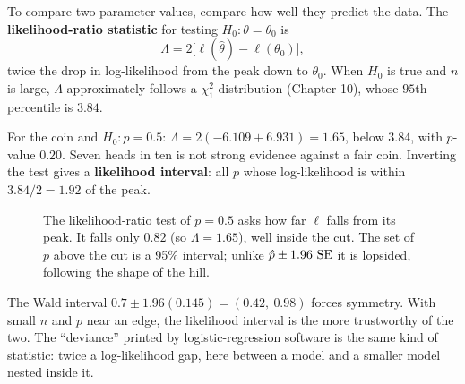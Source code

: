 To compare two parameter values, compare how well they predict the data. The
\textbf{likelihood-ratio statistic} for testing $H_0\colon \theta=\theta_0$ is
\[
  \Lambda = 2\big[\ell(\hat\theta) - \ell(\theta_0)\big],
\]
twice the drop in log-likelihood from the peak down to $\theta_0$. When $H_0$ is true
and $n$ is large, $\Lambda$ approximately follows a $\chi^2_1$ distribution (Chapter 10),
whose $95$th percentile is $3.84$.

For the coin and $H_0\colon p=0.5$: $\Lambda = 2(-6.109 + 6.931) = 1.65$, below
$3.84$, with $p$-value $0.20$. Seven heads in ten is not strong evidence against a fair
coin. Inverting the test gives a \textbf{likelihood interval}: all $p$ whose
log-likelihood is within $3.84/2 = 1.92$ of the peak.

\begin{figure}[H]
\centering
{}
\caption{The likelihood-ratio test of $p=0.5$ asks how far $\ell$ falls from its peak.
It falls only $0.82$ (so $\Lambda=1.65$), well inside the cut. The set of $p$ above the
cut is a 95\% interval; unlike $\hat p\pm1.96\,\operatorname{SE}$ it is lopsided, following the shape
of the hill.}
\label{fig:lik-lr}
\end{figure}

The Wald interval $0.7 \pm 1.96(0.145) = (0.42,\ 0.98)$ forces symmetry. With small $n$
and $p$ near an edge, the likelihood interval is the more trustworthy of the two. The
``deviance'' printed by logistic-regression software is the same kind of statistic: twice a
log-likelihood gap, here between a model and a smaller model nested inside it.

